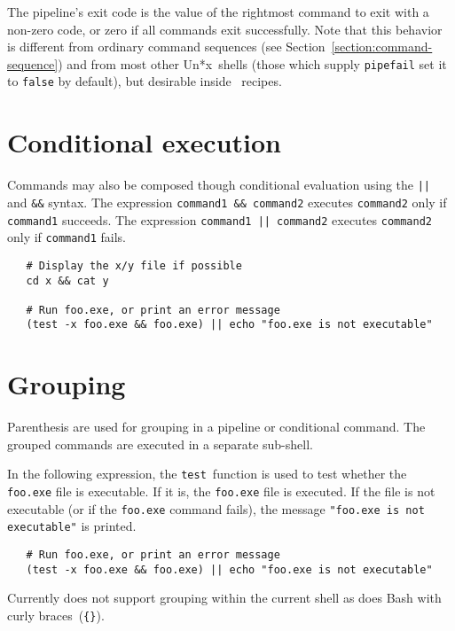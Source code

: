 The pipeline's exit code is the value of the rightmost command to exit with a non-zero code, or zero
if all commands exit successfully.  Note that this behavior is different from ordinary command
sequences (see Section~\ref{section:command-sequence}) and from most other Un*x~shells (those which
supply \verb+pipefail+ set it to \verb+false+ by default), but desirable inside
\OMake~recipes.

\section{Conditional execution}

Commands may also be composed though conditional evaluation using the \verb+||+ and \verb+&&+
syntax.  The expression \verb+command1 && command2+ executes \verb+command2+ only if \verb+command1+
succeeds.  The expression \verb+command1 || command2+ executes \verb+command2+ only if
\verb+command1+ fails.

\begin{verbatim}
   # Display the x/y file if possible
   cd x && cat y

   # Run foo.exe, or print an error message
   (test -x foo.exe && foo.exe) || echo "foo.exe is not executable"
\end{verbatim}

\section{Grouping}

Parenthesis are used for grouping in a pipeline or conditional command.  The grouped commands are
executed in a separate sub-shell.

In the following expression, the \verb+test+~function is used to test whether the \verb+foo.exe+
file is executable.  If it is, the \verb+foo.exe+ file is executed.  If the file is not executable
(or if the \verb+foo.exe+ command fails), the message \verb+"foo.exe is not executable"+ is printed.

\begin{verbatim}
   # Run foo.exe, or print an error message
   (test -x foo.exe && foo.exe) || echo "foo.exe is not executable"
\end{verbatim}

Currently  does not support grouping within the current shell as does Bash with curly
braces~(\verb+{}+).

